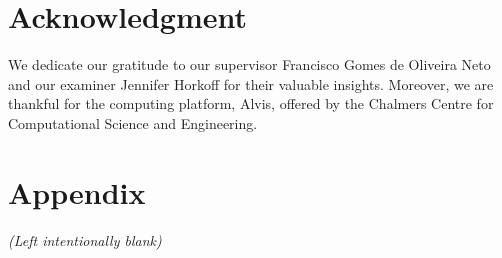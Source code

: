 \documentclass[conference]{IEEEtran}
\begin{document}
\section*{Acknowledgment}
We dedicate our gratitude to our supervisor Francisco Gomes de Oliveira Neto and our examiner Jennifer Horkoff for their valuable insights. Moreover, we are thankful for the computing platform, Alvis, offered by the Chalmers Centre for Computational Science and Engineering.


%
%





\section*{Appendix}\label{appendix}

\textit{(Left intentionally blank)}
\end{document}
